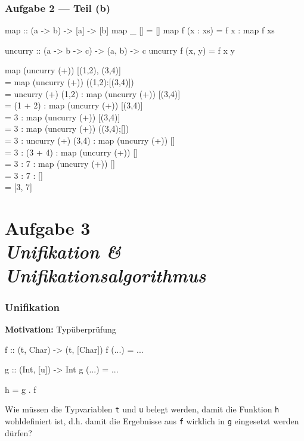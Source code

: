 \documentclass{beamer}
\begin{document}
\begin{frame}[fragile, t] \frametitle{Aufgabe 2 --- Teil (b)}
	
	\begin{codebox}
map :: (a -> b) -> [a] -> [b]
map _ []       = []
map f (x : xs) = f x : map f xs

uncurry :: (a -> b -> c) -> (a, b) -> c
uncurry f (x, y) = f x y
	\end{codebox}
	
	\footnotesize
	\begin{ttfamily}
		map (uncurry (+)) [(1,2), (3,4)] \\ \pause
		= map (uncurry (+)) ((1,2):[(3,4)]) \\
		= uncurry (+) (1,2) : map (uncurry (+)) [(3,4)] \\
		= (1 + 2) : map (uncurry (+)) [(3,4)] \\
		= 3 : map (uncurry (+)) [(3,4)] \\
		= 3 : map (uncurry (+)) ((3,4);[]) \\
		= 3 : uncurry (+) (3,4) : map (uncurry (+)) [] \\
		= 3 : (3 + 4) : map (uncurry (+)) [] \\
		= 3 : 7 : map (uncurry (+)) [] \\
		= 3 : 7 : [] \\
		= [3, 7]
	\end{ttfamily}

\end{frame}



\section{Aufgabe 3 \\ \textit{\normalsize Unifikation \& Unifikationsalgorithmus}}


\begin{frame}[fragile] \frametitle{Unifikation}
	\textbf{Motivation:} Typüberprüfung
		 
	\begin{codebox}
f :: (t, Char) -> (t, [Char])
f (...) = ... 

g :: (Int, [u]) -> Int
g (...) = ...

h = g . f
	\end{codebox}
	
	\pause
	
	Wie müssen die Typvariablen \texttt{t} und \texttt{u} belegt werden, damit die Funktion \texttt{h} wohldefiniert ist, d.h. damit die Ergebnisse aus \texttt{f} wirklich in \texttt{g} eingesetzt werden dürfen?
\end{frame}
\end{document}
